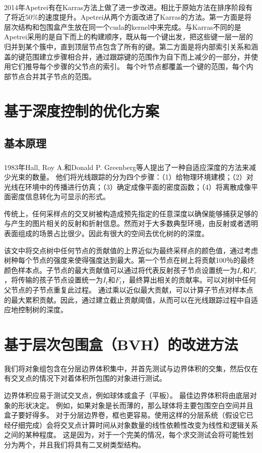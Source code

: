 \documentclass[11pt]{article}
\newcommand{\upcite}[1]{\textsuperscript{\textsuperscript{\cite{#1}}}}
\begin{document}
\par 2014年Apetrei有在Karras方法上做了进一步改进\upcite{apetrei}。相比于原始方法在排序阶段有了将近50\%的速度提升。Apetrei从两个方面改进了Karras的方法。第一方面是将层次结构和包围盒产生放在同一个cuda的kernel中来完成。与Karras不同的是Apetrei采用的是自下而上的构建顺序，既从每一个键出发，把这些键一层一层的归并到某个簇中，直到顶层节点包含了所有的键。第二方面是将内部索引关系和涵盖的键范围建立步骤相合并，通过跟踪键的范围作为自下而上减少的一部分，并使用它们推导每个步骤的父节点的索引。 每个叶节点都覆盖一个键的范围，每个内部节点合并其子节点的范围。



\section{基于深度控制的优化方案}
\subsection{基本原理}
1983年Hall, Roy A.和Donald P. Greenberg\upcite{Hall}等人提出了一种自适应深度的方法来减少光束的数量。
他们将光线跟踪的分为四个步骤：（1）给物理环境建模；（2）对光线在环境中的传播进行仿真；（3）确定成像平面的密度函数；（4）将离散成像平面密度信息转化为可显示的形式。
\par 传统上，任何采样点的交叉树被构造成预先指定的任意深度以确保能够捕获足够的与产生的图片相关的反射和折射信息。然而对于大多数典型环境，由反射或者透明表面组成的场景占比很少。因此有很大的空间去优化树的的深度。
\par 该文中将交点树中任何节点的贡献值的上界近似为最终采样点的颜色值，通过考虑树种每个节点的强度来使得强度达到最大。第一个节点在树上将贡献100％的最终颜色样本点。子节点的最大贡献值可以通过将代表反射孩子节点设置统一为$I_r$和$F_r$，将传输的孩子节点设置统一为$I_t$和$F_t$，最终算出相关的贡献率。可以对树中任何父节点的子节点重复此过程。 通过乘以近似最大贡献，可以计算子节点对样本点的最大累积贡献。因此，通过建立截止贡献阈值，从而可以在光线跟踪过程中自适应地控制树的深度。


\section{基于层次包围盒（BVH）的改进方法}
我们将对象组包含在分层边界体积集中，并首先测试与边界体积的交集，然后仅在有交叉点的情况下对着体积所包围的对象进行测试。
\par 边界体积应易于测试交叉点，例如球体或盒子（平板）。 最佳边界体积将由底层对象的形状决定。 例如，如果对象是长而薄的，那么球体将主要包围空白空间并且盒子要好得多。 对于分层边界卷，框也更容易。使用这样的分层系统（假设它已经仔细完成）会将交叉点计算时间从对象数量的线性依赖性改变为线性和逻辑关系之间的某种程度。 这是因为，对于一个完美的情况，每个求交测试会将可能性划分为两个，并且我们将具有二叉树类型结构。
\end{document}
